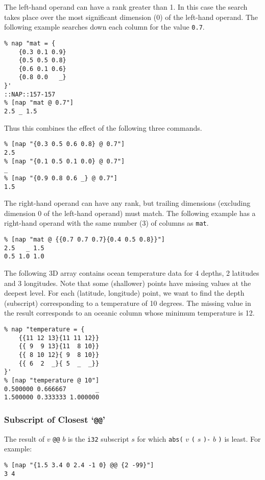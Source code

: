   \par The left-hand operand can have a rank greater than 1. In this case
  the search takes place over the most significant dimension (0) of the
  left-hand operand. The following example searches down each column
  for the value 
  \texttt{0.7}.
  \begin{verbatim}
% nap "mat = {
    {0.3 0.1 0.9}
    {0.5 0.5 0.8}
    {0.6 0.1 0.6}
    {0.8 0.0   _}
}'
::NAP::157-157
% [nap "mat @ 0.7"]
2.5 _ 1.5
\end{verbatim}

  \par Thus this combines the effect of the following three commands.
  \begin{verbatim}
% [nap "{0.3 0.5 0.6 0.8} @ 0.7"]
2.5
% [nap "{0.1 0.5 0.1 0.0} @ 0.7"]
_
% [nap "{0.9 0.8 0.6 _} @ 0.7"]
1.5
\end{verbatim}

  \par The right-hand operand can have any rank, but trailing dimensions
  (excluding dimension 0 of the left-hand operand) must match. The
  following example has a right-hand operand with the same number (3)
  of columns as 
  \texttt{mat}.
  \begin{verbatim}
% [nap "mat @ {{0.7 0.7 0.7}{0.4 0.5 0.8}}"]
2.5   _ 1.5
0.5 1.0 1.0
\end{verbatim}

  \par The following 3D array contains ocean temperature data for 4
  depths, 2 latitudes and 3 longitudes. Note that some (shallower)
  points have missing values at the deepest level. For each (latitude,
  longitude) point, we want to find the depth (subscript) corresponding
  to a temperature of 10 degrees. The missing value in the result
  corresponds to an oceanic column whose minimum temperature is 12.
  \begin{verbatim}
% nap "temperature = {
    {{11 12 13}{11 11 12}}
    {{ 9  9 13}{11  8 10}}
    {{ 8 10 12}{ 9  8 10}}
    {{ 6  2  _}{ 5  _  _}}
}'
% [nap "temperature @ 10"]
0.500000 0.666667        _
1.500000 0.333333 1.000000
\end{verbatim}

  \subsubsection{
    \label{Subscript:of:Closest}Subscript of Closest `\texttt{@@}'
  }

  \par The result of 
  $v$
  \texttt{@@}
  $b$ is the 
  \texttt{i32} subscript 
  $s$ for which 
  \texttt{abs(}
  $v$
  \texttt{(}
  $s$
  \texttt{)-}
  $b$
  \texttt{)} is least. For example:
  \begin{verbatim}
% [nap "{1.5 3.4 0 2.4 -1 0} @@ {2 -99}"]
3 4
\end{verbatim}

